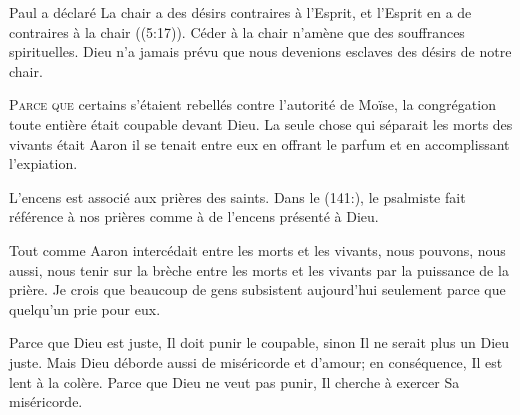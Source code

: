 
Paul a déclaré\frcolon{}
 \Og La chair a des désirs contraires à l'Esprit,
 et l'Esprit en a de contraires à la chair \Fg{} ((5:17)).
 Céder à la chair n'amène que des souffrances spirituelles.
 Dieu n'a jamais prévu que nous devenions esclaves des désirs de notre chair.

\dvrule







\lettrine{P}{arce que} certains s'étaient rebellés contre l'autorité de Moïse,
 la congrégation toute entière était coupable devant Dieu.
 La seule chose qui séparait les morts des vivants était Aaron
 \ocadr{}il se tenait entre eux en offrant le parfum
 et en accomplissant l'expiation.

L'encens est associé aux prières des saints.
 Dans le (141:), le psalmiste
 fait référence à nos prières comme à de l'encens présenté à Dieu.


Tout comme Aaron intercédait entre les morts et les vivants, nous pouvons,
 nous aussi, nous tenir sur la brèche entre les morts et les vivants
 par la puissance de la prière.
 Je crois que beaucoup de gens subsistent aujourd'hui
 seulement parce que quelqu'un prie pour eux.

Parce que Dieu est juste, Il doit punir le coupable,
 sinon Il ne serait plus un Dieu juste.
 Mais Dieu déborde aussi de miséricorde et d'amour;
 en conséquence, Il est lent à la colère.
 Parce que Dieu ne veut pas punir, Il cherche à exercer Sa miséricorde.


